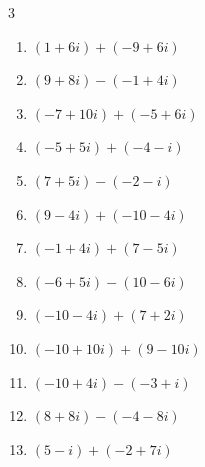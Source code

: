\begin{multicols}{3}
\begin{enumerate}
  \item $\displaystyle (1+6i) + (-9+6i)$

        \phantom{$\displaystyle =-8+12i$}

\columnbreak %

  \item $\displaystyle (9+8i) - (-1+4i)$

        \phantom{$\displaystyle =10+4i$}

  \item $\displaystyle (-7+10i) + (-5+6i)$

        \phantom{$\displaystyle =-12+16i$}

  \item $\displaystyle (-5+5i) + (-4-i)$

        \phantom{$\displaystyle =-9+4i$}

  \item $\displaystyle (7+5i) - (-2-i)$

        \phantom{$\displaystyle =9+6i$}

  \item $\displaystyle (9-4i) + (-10-4i)$

        \phantom{$\displaystyle =-1-8i$}

  \item $\displaystyle (-1+4i) + (7-5i)$

        \phantom{$\displaystyle =6-i$}

  \item $\displaystyle (-6+5i) - (10-6i)$

        \phantom{$\displaystyle =-16+11i$}

  \item $\displaystyle (-10-4i) + (7+2i)$

        \phantom{$\displaystyle =-3-2i$}

  \item $\displaystyle (-10+10i) + (9-10i)$

        \phantom{$\displaystyle =-1$}

  \item $\displaystyle (-10+4i) - (-3+i)$

        \phantom{$\displaystyle =-7+3i$}

  \item $\displaystyle (8+8i) - (-4-8i)$

        \phantom{$\displaystyle =12+16i$}

  \item $\displaystyle (5-i) + (-2+7i)$


\end{enumerate}
\end{multicols}
